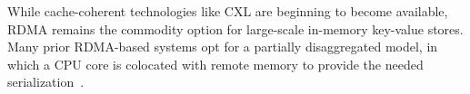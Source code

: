 While cache-coherent technologies like CXL are beginning to
become available, RDMA remains the commodity option for
large-scale in-memory key-value stores.
%
Many prior RDMA-based systems opt for a partially
disaggregated model, in which a CPU core is colocated with
remote memory to provide the needed
serialization~\cite{erpc,herd,pilaf,cell,clover}.
%
